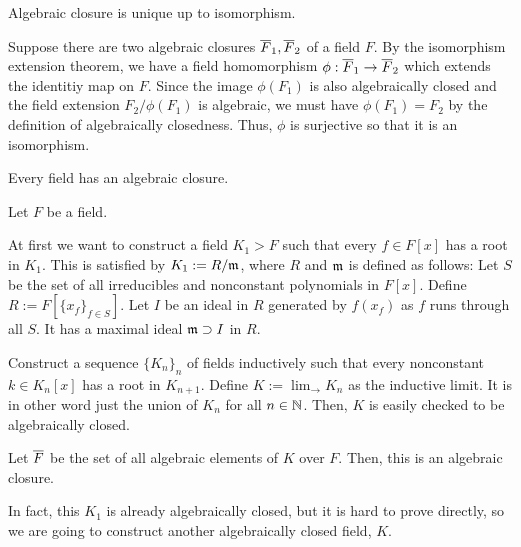\documentclass{../exp}
\begin{document}
\begin{thm}
Algebraic closure is unique up to isomorphism.
\end{thm}
\begin{pf}
Suppose there are two algebraic closures $\overline F_1, \overline F_2$ of a field $F$.
By the isomorphism extension theorem, we have a field homomorphism $\phi:\cl F_1\to\cl F_2$ which extends the identitiy map on $F$.
Since the image $\phi(F_1)$ is also algebraically closed and the field extension $F_2/\phi(F_1)$ is algebraic, we must have $\phi(F_1)=F_2$ by the definition of algebraically closedness.
Thus, $\phi$ is surjective so that it is an isomorphism.
\end{pf}

\begin{thm}
Every field has an algebraic closure.
\end{thm}
\begin{pf}
Let $F$ be a field.

At first we want to construct a field $K_1>F$ such that every $f\in F[x]$ has a root in $K_1$.
This is satisfied by $K_1:=R/\mathfrak{m}$, where $R$ and $\mathfrak{m}$ is defined as follows:
Let $S$ be the set of all irreducibles and nonconstant polynomials in $F[x]$.
Define $R:=F[\{x_f\}_{f\in S}]$.
Let $I$ be an ideal in $R$ generated by $f(x_f)$ as $f$ runs through all $S$.
It has a maximal ideal $\mathfrak{m}\supset I$ in $R$.

Construct a sequence $\{K_n\}_n$ of fields inductively such that every nonconstant $k\in K_n[x]$ has a root in $K_{n+1}$.
Define $K:=\lim_{\to}K_n$ as the inductive limit.
It is in other word just the union of $K_n$ for all $n\in\mathbb{N}$.
Then, $K$ is easily checked to be algebraically closed.

Let $\overline F$ be the set of all algebraic elements of $K$ over $F$.
Then, this is an algebraic closure.
\end{pf}
\begin{rmk}
In fact, this $K_1$ is already algebraically closed, but it is hard to prove directly, so we are going to construct another algebraically closed field, $K$.
\end{rmk}
\end{document}
